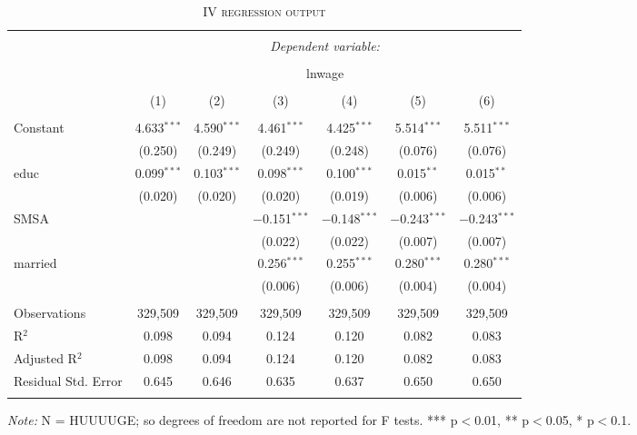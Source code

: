 \documentclass[a4paper]{article}
\begin{document}
\begin{table}[!htbp] \centering 
\begin{adjustwidth}{0.cm}{-0cm}
\begin{threeparttable}
\small
\captionsetup{font=small, justification=raggedright,singlelinecheck=false}
\caption{\textsc{IV regression output}}
\centering 
  \label{}
\small 
\begin{tabular}{@{\extracolsep{-5pt}}lcccccc} 
\\[-5.8ex]\hline 
\hline \\[-1.8ex] 
 & \multicolumn{6}{c}{\textit{Dependent variable:}} \\ 
\cline{2-7} 
\\[-1.8ex] & \multicolumn{6}{c}{lnwage} \\ 
\\[-1.8ex] & (1) & (2) & (3) & (4) & (5) & (6)\\ 
\hline \\[-1.8ex] 
 Constant & 4.633$^{***}$ & 4.590$^{***}$ & 4.461$^{***}$ & 4.425$^{***}$ & 5.514$^{***}$ & 5.511$^{***}$ \\ 
  & (0.250) & (0.249) & (0.249) & (0.248) & (0.076) & (0.076) \\ 
  educ & 0.099$^{***}$ & 0.103$^{***}$ & 0.098$^{***}$ & 0.100$^{***}$ & 0.015$^{**}$ & 0.015$^{**}$ \\ 
  & (0.020) & (0.020) & (0.020) & (0.019) & (0.006) & (0.006) \\ 
  SMSA &  &  & $-$0.151$^{***}$ & $-$0.148$^{***}$ & $-$0.243$^{***}$ & $-$0.243$^{***}$ \\ 
  &  &  & (0.022) & (0.022) & (0.007) & (0.007) \\ 
  married &  &  & 0.256$^{***}$ & 0.255$^{***}$ & 0.280$^{***}$ & 0.280$^{***}$ \\ 
  &  &  & (0.006) & (0.006) & (0.004) & (0.004) \\ 
 \hline \\[-1.8ex] 
Observations & 329,509 & 329,509 & 329,509 & 329,509 & 329,509 & 329,509 \\ 
R$^{2}$ & 0.098 & 0.094 & 0.124 & 0.120 & 0.082 & 0.083 \\ 
Adjusted R$^{2}$ & 0.098 & 0.094 & 0.124 & 0.120 & 0.082 & 0.083 \\ 
Residual Std. Error & 0.645  & 0.646  & 0.635  & 0.637 & 0.650 & 0.650  \\ 
\hline 
\hline \\[-3.5ex] 
\end{tabular} 
\begin{tablenotes}
      \small
      \item\textit{Note:} N = HUUUUGE; so degrees of freedom are not reported for F tests. *** p$<$0.01, ** p$<$0.05, * p$<$0.1.
    \end{tablenotes}
\end{threeparttable}
\end{adjustwidth}
%
\end{table}
\end{document}

